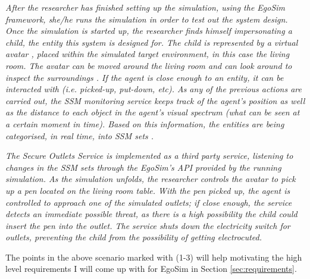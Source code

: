\begin{flushright}{\slshape
After the researcher has finished setting up the simulation, using the EgoSim framework, she/he runs the simulation in order to test out the system design. Once the simulation is started up, the researcher finds himself impersonating a child, the entity this system is designed for. The child is represented by a virtual avatar , placed within the simulated target environment, in this case the living room. The avatar can be moved around the living room  and can look around to inspect the surroundings . If the agent is close enough  to an entity, it can be interacted with (i.e. picked-up, put-down, etc). As any of the previous actions are carried out, the SSM monitoring service  keeps track of the agent's position as well as the distance to each object in the agent's visual spectrum (what can be seen at a certain moment in time). Based on this information, the entities are being categorised, in real time, into SSM sets .
} \\ \medskip
\end{flushright}

\begin{flushright}{\slshape
The Secure Outlets Service is implemented as a third party service, listening to changes in the SSM sets through the EgoSim's API  provided by the running simulation. As the simulation unfolds, the researcher controls the avatar to pick up a pen located on the living room table. With the pen picked up, the agent is controlled to approach one of the simulated outlets; if close enough, the service detects an immediate possible threat, as there is a high possibility the child could insert the pen into the outlet. The service shuts down the electricity switch for outlets, preventing the child from the possibility of getting electrocuted.
} \\ \medskip
\end{flushright}

The points in the above scenario marked with (1-3) will help motivating the high level requirements I will come up with for EgoSim in Section \ref{sec:requirements}.
